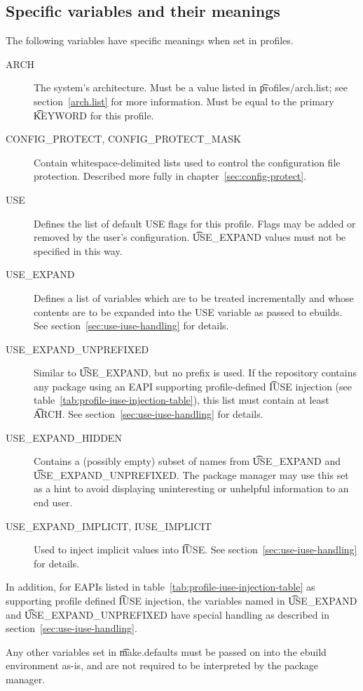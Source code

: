 \subsection{Specific variables and their meanings}
The following variables have specific meanings when set in profiles.
\begin{description}
\item[ARCH] The system's architecture. Must be a value listed in \t{profiles/arch.list}; see
    section~\ref{arch.list} for more information. Must be equal to the primary \t{KEYWORD} for this
    profile.
\item[CONFIG\_PROTECT, CONFIG\_PROTECT\_MASK] Contain whitespace-delimited lists used to control the
    configuration file protection. Described more fully in chapter~\ref{sec:config-protect}.
\item[USE] Defines the list of default USE flags for this profile. Flags may be added or removed by
    the user's configuration. \t{USE\_EXPAND} values must not be specified in this way.
\item[USE\_EXPAND] Defines a list of variables which are to be treated incrementally and whose
    contents are to be expanded into the USE variable as passed to ebuilds. See
    section~\ref{sec:use-iuse-handling} for details.
\item[USE\_EXPAND\_UNPREFIXED] Similar to \t{USE\_EXPAND}, but no prefix is used. If the repository
    contains any package using an EAPI supporting profile-defined \t{IUSE} injection (see
    table~\ref{tab:profile-iuse-injection-table}), this list must contain at least \t{ARCH}. See
    section~\ref{sec:use-iuse-handling} for details.
\item[USE\_EXPAND\_HIDDEN] Contains a (possibly empty) subset of names from \t{USE\_EXPAND} and
    \t{USE\_EXPAND\_UNPREFIXED}. The package manager may use this set as a hint to avoid displaying
    uninteresting or unhelpful information to an end user.
\item[USE\_EXPAND\_IMPLICIT, IUSE\_IMPLICIT] Used to inject implicit values into \t{IUSE}. See
    section~\ref{sec:use-iuse-handling} for details.
\end{description}

In addition, for EAPIs listed in table~\ref{tab:profile-iuse-injection-table} as supporting profile
defined \t{IUSE} injection, the variables named in \t{USE\_EXPAND} and \t{USE\_EXPAND\_UNPREFIXED}
have special handling as described in section~\ref{sec:use-iuse-handling}.

Any other variables set in \t{make.defaults} must be passed on into the ebuild environment as-is,
and are not required to be interpreted by the package manager.


